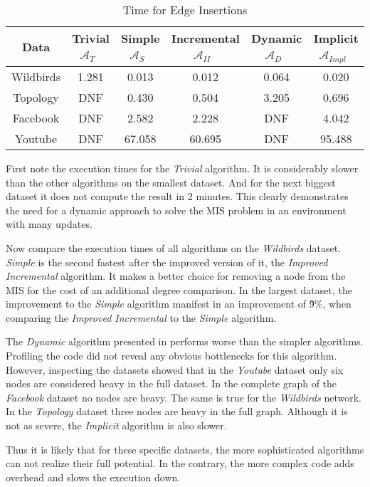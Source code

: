 \documentclass[letterpaper,11pt]{article}
\newcommand{\trivial}{$\mathcal{A}_T$\ }
\newcommand{\simple}{$\mathcal{A}_S$\ }
\newcommand{\improvedinc}{$\mathcal{A}_{II}$\ }
\newcommand{\dynamic}{$\mathcal{A}_{D}$\ }
\newcommand{\implicit}{$\mathcal{A}_{Impl}$\ }
\begin{document}
\begin{table}[H]
  \caption{Time for Edge Insertions}
  \label{tab:insertion}
  \centering
  \setlength{\extrarowheight}{0.3em}
  \begin{tabular}{|c|c|c|c|c|c|}
    \hline
    Data & Trivial \trivial & Simple \simple & Incremental \improvedinc & Dynamic \dynamic & Implicit \implicit \\
    \hline
    \hline
    Wildbirds & 1.281 & 0.013 & 0.012 & 0.064 & 0.020 \\
    \hline
    Topology & DNF & 0.430 & 0.504 & 3.205 & 0.696 \\
    \hline
    Facebook & DNF & 2.582 & 2.228 & DNF & 4.042 \\
    \hline
    Youtube & DNF & 67.058 & 60.695 & DNF & 95.488 \\
    \hline
  \end{tabular}
\end{table}

First note the execution times for the \textit{Trivial} algorithm.
It is considerably slower than the other algorithms on the smallest dataset.
And for the next biggest dataset it does not compute the result in 2 minutes.
This clearly demonstrates the need for a dynamic approach to solve the MIS
problem in an environment with many updates.

Now compare the execution times of all algorithms on the \textit{Wildbirds}
dataset. \textit{Simple} is the second fastest after the improved version of it,
the \textit{Improved Incremental} algorithm. It makes a better choice for removing
a node from the MIS for the cost of an additional degree comparison.
In the largest dataset, the improvement to the \textit{Simple} algorithm
manifest in an improvement of \~9\%, when comparing the \textit{Improved Incremental}
to the \textit{Simple} algorithm.

The \textit{Dynamic} algorithm presented in \cite{gupta2018simple} performs
worse than the simpler algorithms. Profiling the code did not reveal
any obvious bottlenecks for this algorithm.
However, inspecting the datasets showed that in the \textit{Youtube} dataset
only six nodes are considered heavy in the full dataset. In the complete graph
of the \textit{Facebook} dataset no nodes are heavy. The same is true for the
\textit{Wildbirds} network. In the \textit{Topology} dataset three nodes are
heavy in the full graph.
Although it is not as severe, the \textit{Implicit} algorithm is also slower.

Thus it is likely that for these specific datasets, the more sophisticated
algorithms can not realize their full potential.
In the contrary, the more complex code adds overhead and slows the execution down.
\end{document}
